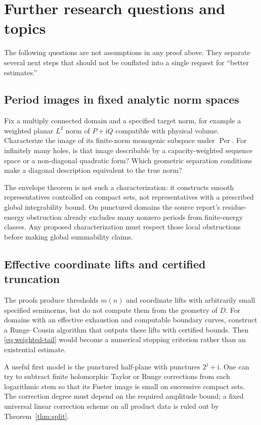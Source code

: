 \documentclass[11pt,a4paper]{article}
\numberwithin{equation}{section}
\theoremstyle{definition}
\theoremstyle{remark}
\newcommand{\ii}{\mathrm i}
\newcommand{\Per}{\operatorname{Per}}
\begin{document}
\section{Further research questions and topics}
\label{sec:future}

The following questions are not assumptions in any proof above. They separate
several next steps that should not be conflated into a single request for
``better estimates.''

\subsection{Period images in fixed analytic norm spaces}

Fix a multiply connected domain and a specified target norm, for example a
weighted planar $L^2$ norm of $P+\ii Q$ compatible with physical volume.
Characterize the image of its finite-norm monogenic subspace under $\Per$.
For infinitely many holes, is that image describable by a capacity-weighted
sequence space or a non-diagonal quadratic form? Which geometric separation
conditions make a diagonal description equivalent to the true norm?

The envelope theorem is not such a characterization: it constructs smooth
representatives controlled on compact sets, not representatives with a
prescribed global integrability bound. On punctured domains the source
report's residue-energy obstruction already excludes many nonzero periods
from finite-energy classes. Any proposed characterization must respect those
local obstructions before making global summability claims.

\subsection{Effective coordinate lifts and certified truncation}

The proofs produce thresholds $m(n)$ and coordinate lifts with arbitrarily
small specified seminorms, but do not compute them from the geometry of $D$.
For domains with an effective exhaustion and computable boundary curves,
construct a Runge--Cousin algorithm that outputs these lifts with certified
bounds. Then \eqref{eq:weighted-tail} would become a numerical stopping
criterion rather than an existential estimate.

A useful first model is the punctured half-plane with punctures
$2^j+\ii$. One can try to subtract finite holomorphic Taylor or Runge
corrections from each logarithmic stem so that its Fueter image is small on
successive compact sets. The correction degree must depend on the required
amplitude bound; a fixed universal linear correction scheme on all product
data is ruled out by Theorem~\ref{thm:split}.
\end{document}
